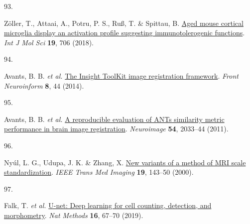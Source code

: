 \documentclass[
  12pt,
]{article}
\newlength{\cslhangindent}
\newlength{\csllabelwidth}
\newenvironment{CSLReferences}[2] %
 {\begin{list}{}{%
  \setlength{\itemindent}{0pt}
  \setlength{\leftmargin}{0pt}
  \setlength{\parsep}{0pt}
  \ifodd #1
   \setlength{\leftmargin}{\cslhangindent}
   \setlength{\itemindent}{-1\cslhangindent}
  \fi
  \setlength{\itemsep}{#2\baselineskip}}}
 {\end{list}}
\newcommand{\CSLLeftMargin}[1]{\parbox[t]{\csllabelwidth}{\strut#1\strut}}
\newcommand{\CSLRightInline}[1]{\parbox[t]{\linewidth - \csllabelwidth}{\strut#1\strut}}
\begin{document}
\begin{CSLReferences}{0}{0}
\CSLLeftMargin{93. }%
\CSLRightInline{Zöller, T., Attaai, A., Potru, P. S., Ruß, T. \&
Spittau, B. \href{https://doi.org/10.3390/ijms19030706}{Aged mouse
cortical microglia display an activation profile suggesting
immunotolerogenic functions}. \emph{Int J Mol Sci} \textbf{19}, 706
(2018).}

\CSLLeftMargin{94. }%
\CSLRightInline{Avants, B. B. \emph{et al.}
\href{https://doi.org/10.3389/fninf.2014.00044}{The {Insight} {ToolKit}
image registration framework}. \emph{Front Neuroinform} \textbf{8}, 44
(2014).}

\CSLLeftMargin{95. }%
\CSLRightInline{Avants, B. B. \emph{et al.}
\href{https://doi.org/10.1016/j.neuroimage.2010.09.025}{A reproducible
evaluation of ANTs similarity metric performance in brain image
registration}. \emph{Neuroimage} \textbf{54}, 2033--44 (2011).}

\CSLLeftMargin{96. }%
\CSLRightInline{Nyúl, L. G., Udupa, J. K. \& Zhang, X.
\href{https://doi.org/10.1109/42.836373}{New variants of a method of MRI
scale standardization}. \emph{IEEE Trans Med Imaging} \textbf{19},
143--50 (2000).}

\CSLLeftMargin{97. }%
\CSLRightInline{Falk, T. \emph{et al.}
\href{https://doi.org/10.1038/s41592-018-0261-2}{U-net: Deep learning
for cell counting, detection, and morphometry}. \emph{Nat Methods}
\textbf{16}, 67--70 (2019).}

\end{CSLReferences}
\end{document}

